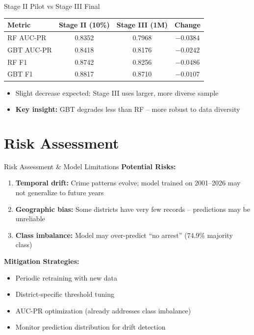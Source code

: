 \documentclass[10pt]{beamer}
\begin{document}
\begin{frame}{Stage II Pilot vs Stage III Final}
\begin{table}
\centering
\begin{tabular}{lccc}
\toprule
\textbf{Metric} & \textbf{Stage II (10\%)} & \textbf{Stage III (1M)} & \textbf{Change} \\
\midrule
RF AUC-PR & 0.8352 & 0.7968 & $-0.0384$ \\
GBT AUC-PR & 0.8418 & 0.8176 & $-0.0242$ \\
RF F1 & 0.8742 & 0.8256 & $-0.0486$ \\
GBT F1 & 0.8817 & 0.8710 & $-0.0107$ \\
\bottomrule
\end{tabular}
\end{table}

\begin{itemize}
    \item Slight decrease expected: Stage III uses larger, more diverse sample
    \item \textbf{Key insight:} GBT degrades less than RF -- more robust to data diversity
\end{itemize}
\end{frame}

\section{Risk Assessment}

\newcommand{\riskframe}{Risk Assessment \& Model Limitations}

\begin{frame}{\riskframe}
\textbf{Potential Risks:}
\begin{enumerate}
    \item \textbf{Temporal drift:} Crime patterns evolve; model trained on 2001--2026 may not generalize to future years
    \item \textbf{Geographic bias:} Some districts have very few records -- predictions may be unreliable
    \item \textbf{Class imbalance:} Model may over-predict ``no arrest'' (74.9\% majority class)
\end{enumerate}

\vspace{0.3cm}
\textbf{Mitigation Strategies:}
\begin{itemize}
    \item Periodic retraining with new data
    \item District-specific threshold tuning
    \item AUC-PR optimization (already addresses class imbalance)
    \item Monitor prediction distribution for drift detection
\end{itemize}
\end{frame}
\end{document}
